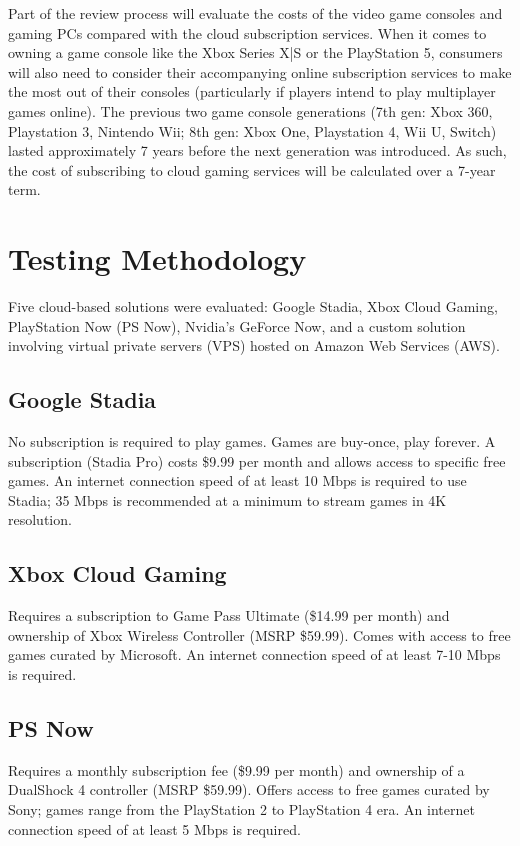 \documentclass[titlepage, 12pt]{article}
\begin{document}
Part of the review process will evaluate the costs of the video game consoles and gaming PCs compared with the cloud subscription services. When it comes to owning a game console like the Xbox Series X|S or the PlayStation 5, consumers will also need to consider their accompanying online subscription services to make the most out of their consoles (particularly if players intend to play multiplayer games online). The previous two game console generations (7th gen: Xbox 360, Playstation 3, Nintendo Wii; 8th gen: Xbox One, Playstation 4, Wii U, Switch) lasted approximately 7 years before the next generation was introduced. As such, the cost of subscribing to cloud gaming services will be calculated over a 7-year term.

\section{Testing Methodology}

Five cloud-based solutions were evaluated: Google Stadia, Xbox Cloud Gaming, PlayStation Now (PS Now), Nvidia's GeForce Now, and a custom solution involving virtual private servers (VPS) hosted on Amazon Web Services (AWS).

	\subsection{Google Stadia}
	
	No subscription is required to play games. Games are buy-once, play forever. A subscription (Stadia Pro) costs \$9.99 per month and allows access to specific free games. An internet connection speed of at least 10 Mbps is required to use Stadia; 35 Mbps is recommended at a minimum to stream games in 4K resolution.
	
	\subsection{Xbox Cloud Gaming}
	
	Requires a subscription to Game Pass Ultimate (\$14.99 per month) and ownership of Xbox Wireless Controller (MSRP \$59.99). Comes with access to free games curated by Microsoft. An internet connection speed of at least 7-10 Mbps is required.
	
	\subsection{PS Now}
	
	Requires a monthly subscription fee (\$9.99 per month) and ownership of a DualShock 4 controller (MSRP \$59.99). Offers access to free games curated by Sony; games range from the PlayStation 2 to PlayStation 4 era. An internet connection speed of at least 5 Mbps is required.
	
\end{document}
